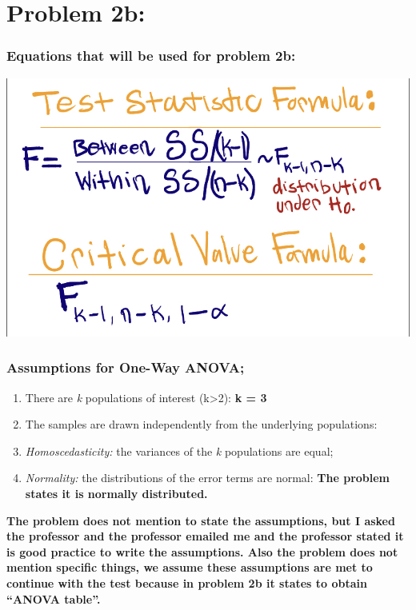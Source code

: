 \documentclass[
]{article}
\begin{document}
\newpage

\hypertarget{problem-2b}{%
\section{Problem 2b:}\label{problem-2b}}

\hypertarget{equations-that-will-be-used-for-problem-2b}{%
\subsubsection{Equations that will be used for problem
2b:}\label{equations-that-will-be-used-for-problem-2b}}

\begin{center}\includegraphics[width=0.5\linewidth]{problem2eq} \end{center}

\hypertarget{assumptions-for-one-way-anova}{%
\subsubsection{Assumptions for One-Way
ANOVA;}\label{assumptions-for-one-way-anova}}

\begin{enumerate}
\def\labelenumi{\arabic{enumi}.}
\item
  There are \emph{k} populations of interest (k\textgreater2): \textbf{k
  = 3}
\item
  The samples are drawn independently from the underlying populations:
\item
  \emph{Homoscedasticity:} the variances of the \emph{k} populations are
  equal;
\item
  \emph{Normality:} the distributions of the error terms are normal:
  \textbf{The problem states it is normally distributed.}
\end{enumerate}

\textbf{The problem does not mention to state the assumptions, but I
asked the professor and the professor emailed me and the professor
stated it is good practice to write the assumptions. Also the problem
does not mention specific things, we assume these assumptions are met to
continue with the test because in problem 2b it states to obtain ``ANOVA
table''.}
\end{document}
